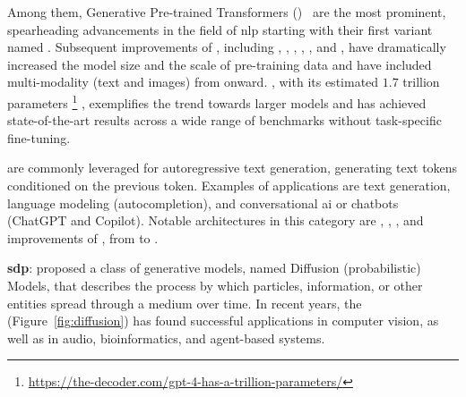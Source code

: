Among them, Generative Pre-trained Transformers ()~\cite{radford2018improving} are the most prominent, spearheading advancements in the field of \gls{nlp} starting with their first variant named .
%
Subsequent improvements of , including , , , , , and , have dramatically increased the model size and the scale of pre-training data and have included multi-modality (text and images) from  onward.
, with its estimated $1.7$ trillion parameters%
\footnote{\url{https://the-decoder.com/gpt-4-has-a-trillion-parameters/}}%
, exemplifies the trend towards larger models and has achieved state-of-the-art results across a wide range of benchmarks without task-specific fine-tuning.

 are commonly leveraged for autoregressive text generation, \ie generating text tokens conditioned on the previous token.
Examples of applications are text generation,
language modeling (\eg autocompletion), and conversational \gls{ai} or chatbots (\eg ChatGPT and Copilot).
Notable architectures in this category are , , ,  and improvements of , from  to .

\vspace{5pt}
\noindent
\textbf{\gls{sdp}}:
\citet{ho2020denoising} proposed 
a class of generative models,
named Diffusion (probabilistic) Models,
that describes the process by which particles, information, or other entities spread through a medium over time.
%
In recent years, the  (Figure~\ref{fig:diffusion}) has found successful applications in computer vision, as well as in audio, bioinformatics, and agent-based systems. 

